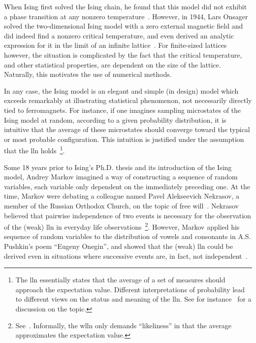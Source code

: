 \documentclass[english,notitlepage,reprint]{revtex4-2}  %
\begin{document}
When Ising first solved the Ising chain, he found that this model did not exhibit a phase transition at any nonzero temperature~\cite[p. 431]{IntroStatMekSwendsen}. 
However, in 1944, Lars Onsager solved the two-dimensional Ising model with a zero external magnetic field and did indeed find a nonzero critical temperature, and even derived an analytic expression for it in the limit of an infinite lattice~\cite{LarsOnsager}. 
For finite-sized lattices however, the situation is complicated by the fact that the critical temperature, and other statistical properties, are dependent on the size of the lattice.
Naturally, this motivates the use of numerical methods.

In any case, the Ising model is an elegant and simple (in design) model which exceeds remarkably at illustrating statistical phenomenon, not necessarily directly tied to ferromagnets. 
For instance, if one imagines sampling microstates of the Ising model at random, according to a given probability distribution, it is intuitive that the average of these microstates should converge toward the typical or most probable configuration.
This intuition is justified under the assumption that the \gls{lln} holds~\footnote{The \gls{lln} essentially states that the average of a set of measures should approach the expectation value. Different interpretations of probability lead to different views on the status and meaning of the \gls{lln}. See for instance~\cite{philosophies2030020} for a discussion on the topic.}.

Some 18 years prior to Ising's Ph.D. thesis and its introduction of the Ising model, Andrey Markov imagined a way of constructing a sequence of random variables, each variable only dependent on the immediately preceding one. 
At the time, Markov were debating a colleague named Pavel Alekseevich Nekrasov, a member of the Russian Orthodox Church, on the topic of free will~\cite{lifeOfMarkov}. 
Nekrasov believed that pairwise independence of two events is necessary for the observation of the (weak) \gls{lln} in everyday life observations~\footnote{See~\cite{Markov_and_birth_of_chain}. Informally, the \gls{wlln} only demands ``likeliness'' in that the average approximates the expectation value.}. 
However, Markov applied his sequence of random variables to the distribution of vowels and consonants in A.S. Pushkin's poem ``Eugeny Onegin'', and showed that the (weak) \gls{lln} could be derived even in situations where successive events are, in fact, not independent~\cite{lifeOfMarkov}.
\end{document}
